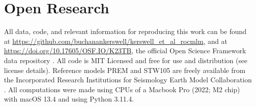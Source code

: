 \documentclass[draft,linenumbers]{agujournal2018}
\begin{document}
\section{Open Research}\label{open-research}

All data, code, and relevant information for reproducing this work can be found at \url{https://github.com/buchanankerswell/kerswell_et_al_rocmlm}, and at \url{https://doi.org/10.17605/OSF.IO/K23TB}, the official Open Science Framework data repository \citep{kerswell2024}. All code is MIT Licensed and free for use and distribution (see license details). Reference models PREM and STW105 are freely available from the Incorporated Research Institutions for Seismology Earth Model Collaboration \citep[IRIS EMC, doi: 10.17611/DP/EMC.1,][]{trabant2012}. All computations were made using CPUs of a Macbook Pro (2022; M2 chip) with macOS 13.4 and using Python 3.11.4.

\clearpage

\cleardoublepage


\end{document}
